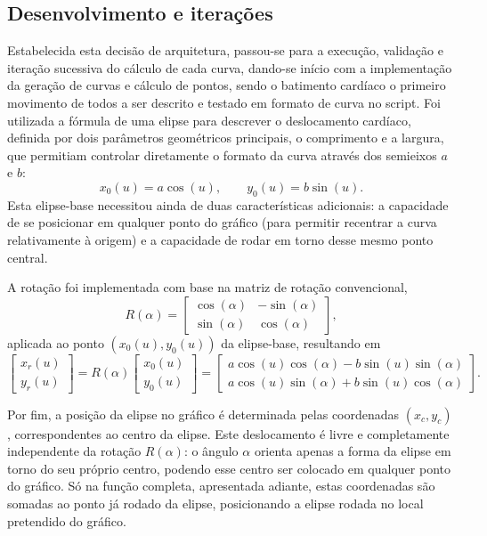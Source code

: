 \subsection{Desenvolvimento e iterações}
Estabelecida esta decisão de arquitetura, passou-se para a execução, validação e iteração sucessiva do cálculo de cada curva, dando-se início com a implementação da geração de curvas e cálculo de pontos, sendo o batimento cardíaco o primeiro movimento de todos a ser descrito e testado em formato de curva no script. Foi utilizada a fórmula de uma elipse para descrever o deslocamento cardíaco, definida por dois parâmetros geométricos principais, o comprimento e a largura, que permitiam controlar diretamente o formato da curva através dos semieixos \(a\) e \(b\):
\[
x_0(u) = a\cos(u), \qquad y_0(u) = b\sin(u).
\]
Esta elipse-base necessitou ainda de duas características adicionais: a capacidade de se posicionar em qualquer ponto do gráfico (para permitir recentrar a curva relativamente à origem) e a capacidade de rodar em torno desse mesmo ponto central.

A rotação foi implementada com base na matriz de rotação convencional,
\[
R(\alpha) =
\begin{bmatrix}
\cos(\alpha) & -\sin(\alpha) \\
\sin(\alpha) & \cos(\alpha)
\end{bmatrix},
\]
aplicada ao ponto \((x_0(u),y_0(u))\) da elipse-base, resultando em
\[
\begin{bmatrix} x_r(u) \\ y_r(u) \end{bmatrix}
= R(\alpha)\begin{bmatrix} x_0(u) \\ y_0(u) \end{bmatrix}
= \begin{bmatrix} a\cos(u)\cos(\alpha) - b\sin(u)\sin(\alpha) \\ a\cos(u)\sin(\alpha) + b\sin(u)\cos(\alpha) \end{bmatrix}.
\]

Por fim, a posição da elipse no gráfico é determinada pelas coordenadas \((x_c,y_c)\), correspondentes ao centro da elipse. Este deslocamento é livre e completamente independente da rotação \(R(\alpha)\): o ângulo \(\alpha\) orienta apenas a forma da elipse em torno do seu próprio centro, podendo esse centro ser colocado em qualquer ponto do gráfico. Só na função completa, apresentada adiante, estas coordenadas são somadas ao ponto já rodado da elipse, posicionando a elipse rodada no local pretendido do gráfico.

